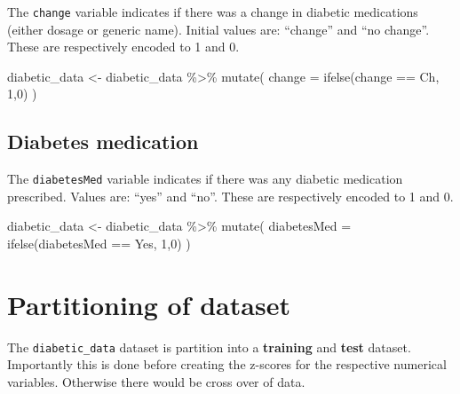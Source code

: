 \documentclass[
]{article}
\newenvironment{Shaded}{\begin{snugshade}}{\end{snugshade}}
\newcommand{\AttributeTok}[1]{\textcolor[rgb]{0.77,0.63,0.00}{#1}}
\newcommand{\DecValTok}[1]{\textcolor[rgb]{0.00,0.00,0.81}{#1}}
\newcommand{\FunctionTok}[1]{\textcolor[rgb]{0.00,0.00,0.00}{#1}}
\newcommand{\NormalTok}[1]{#1}
\newcommand{\OtherTok}[1]{\textcolor[rgb]{0.56,0.35,0.01}{#1}}
\newcommand{\SpecialCharTok}[1]{\textcolor[rgb]{0.00,0.00,0.00}{#1}}
\newcommand{\StringTok}[1]{\textcolor[rgb]{0.31,0.60,0.02}{#1}}
\begin{document}
The \texttt{change} variable indicates if there was a change in diabetic
medications (either dosage or generic name). Initial values are:
``change'' and ``no change''. These are respectively encoded to 1 and 0.

\begin{Shaded}
\begin{Highlighting}[]
\NormalTok{diabetic\_data }\OtherTok{\textless{}{-}}\NormalTok{ diabetic\_data }\SpecialCharTok{\%\textgreater{}\%}
  \FunctionTok{mutate}\NormalTok{(}
    \AttributeTok{change =} \FunctionTok{ifelse}\NormalTok{(change }\SpecialCharTok{==} \StringTok{\textquotesingle{}Ch\textquotesingle{}}\NormalTok{, }\DecValTok{1}\NormalTok{,}\DecValTok{0}\NormalTok{)}
\NormalTok{  )}
\end{Highlighting}
\end{Shaded}

\hypertarget{diabetes-medication}{%
\subsection{Diabetes medication}\label{diabetes-medication}}

The \texttt{diabetesMed} variable indicates if there was any diabetic
medication prescribed. Values are: ``yes'' and ``no''. These are
respectively encoded to 1 and 0.

\begin{Shaded}
\begin{Highlighting}[]
\NormalTok{diabetic\_data }\OtherTok{\textless{}{-}}\NormalTok{ diabetic\_data }\SpecialCharTok{\%\textgreater{}\%}
  \FunctionTok{mutate}\NormalTok{(}
    \AttributeTok{diabetesMed =} \FunctionTok{ifelse}\NormalTok{(diabetesMed }\SpecialCharTok{==} \StringTok{\textquotesingle{}Yes\textquotesingle{}}\NormalTok{, }\DecValTok{1}\NormalTok{,}\DecValTok{0}\NormalTok{)}
\NormalTok{  )}
\end{Highlighting}
\end{Shaded}

\hypertarget{partitioning-of-dataset}{%
\section{Partitioning of dataset}\label{partitioning-of-dataset}}

The \texttt{diabetic\_data} dataset is partition into a
\textbf{training} and \textbf{test} dataset. Importantly this is done
before creating the z-scores for the respective numerical variables.
Otherwise there would be cross over of data.
\end{document}
